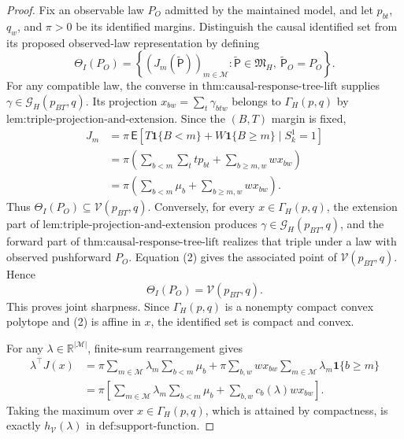 \documentclass{article}
\begin{document}
\begin{proof}
Fix an observable law \(P_O\) admitted by the maintained model, and let \(p_{bt}\), \(q_w\), and \(\pi>0\) be its identified margins.  Distinguish the causal identified set from its proposed observed-law representation by defining
\[
 \Theta_I(P_O)=\left\{(J_m(\widetilde{\mathsf P}))_{m\in\mathcal M}:
 \widetilde{\mathsf P}\in\mathfrak M_H,
 \ \widetilde{\mathsf P}_O=P_O\right\}.                  \tag{1}
\]
For any compatible law, the converse in \(\text{thm:causal-response-tree-lift}\) supplies \(\gamma\in\mathcal G_H(p_{BT},q)\).  Its projection \(x_{bw}=\sum_t\gamma_{btw}\) belongs to \(\Gamma_H(p,q)\) by \(\text{lem:triple-projection-and-extension}\).  Since the \((B,T)\) margin is fixed,
\[
 \begin{aligned}
 J_m
 &=\pi\,\mathsf E[T\mathbf 1\{B<m\}+W\mathbf 1\{B\ge m\}\mid S_k^1=1]\\
 &=\pi\left(\sum_{b<m}\sum_ttp_{bt}+\sum_{b\ge m,w}wx_{bw}\right)\\
 &=\pi\left(\sum_{b<m}\mu_b+\sum_{b\ge m,w}wx_{bw}\right).              \tag{2}
 \end{aligned}
\]
Thus \(\Theta_I(P_O)\subseteq\mathcal V(p_{BT},q)\).  Conversely, for every \(x\in\Gamma_H(p,q)\), the extension part of \(\text{lem:triple-projection-and-extension}\) produces \(\gamma\in\mathcal G_H(p_{BT},q)\), and the forward part of \(\text{thm:causal-response-tree-lift}\) realizes that triple under a law with observed pushforward \(P_O\).  Equation (2) gives the associated point of \(\mathcal V(p_{BT},q)\).  Hence
\[
 \Theta_I(P_O)=\mathcal V(p_{BT},q).                       \tag{3}
\]
This proves joint sharpness.  Since \(\Gamma_H(p,q)\) is a nonempty compact convex polytope and (2) is affine in \(x\), the identified set is compact and convex.

For any \(\lambda\in\mathbb R^{|\mathcal M|}\), finite-sum rearrangement gives
\[
 \begin{aligned}
 \lambda^\top J(x)
 &=\pi\sum_{m\in\mathcal M}\lambda_m\sum_{b<m}\mu_b
   +\pi\sum_{b,w}wx_{bw}\sum_{m\in\mathcal M}\lambda_m\mathbf 1\{b\ge m\}\\
 &=\pi\left[\sum_{m\in\mathcal M}\lambda_m\sum_{b<m}\mu_b
   +\sum_{b,w}c_b(\lambda)wx_{bw}\right].                 \tag{4}
 \end{aligned}
\]
Taking the maximum over \(x\in\Gamma_H(p,q)\), which is attained by compactness, is exactly \(h_{\mathcal V}(\lambda)\) in \(\text{def:support-function}\).


\end{proof}
\end{document}
